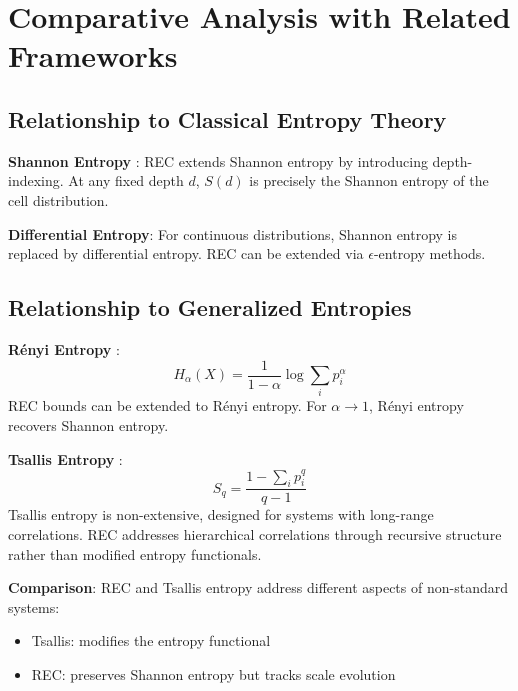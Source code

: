 \documentclass[11pt,a4paper]{article}
\theoremstyle{definition}
\theoremstyle{remark}
\begin{document}
\section{Comparative Analysis with Related Frameworks}
\label{sec:literature}

\subsection{Relationship to Classical Entropy Theory}

\textbf{Shannon Entropy} \cite{shannon1948}: REC extends Shannon entropy by introducing depth-indexing. At any fixed depth $d$, $S(d)$ is precisely the Shannon entropy of the cell distribution.

\textbf{Differential Entropy}: For continuous distributions, Shannon entropy is replaced by differential entropy. REC can be extended via $\epsilon$-entropy methods.

\subsection{Relationship to Generalized Entropies}

\textbf{R\'enyi Entropy} \cite{renyi1961}: 
\begin{equation}
    H_\alpha(X) = \frac{1}{1-\alpha} \log \sum_i p_i^\alpha
\end{equation}
REC bounds can be extended to R\'enyi entropy. For $\alpha \to 1$, R\'enyi entropy recovers Shannon entropy.

\textbf{Tsallis Entropy} \cite{tsallis1988}:
\begin{equation}
    S_q = \frac{1 - \sum_i p_i^q}{q - 1}
\end{equation}
Tsallis entropy is non-extensive, designed for systems with long-range correlations. REC addresses hierarchical correlations through recursive structure rather than modified entropy functionals.

\textbf{Comparison}: REC and Tsallis entropy address different aspects of non-standard systems:
\begin{itemize}[nosep]
    \item Tsallis: modifies the entropy functional
    \item REC: preserves Shannon entropy but tracks scale evolution
\end{itemize}
\end{document}

